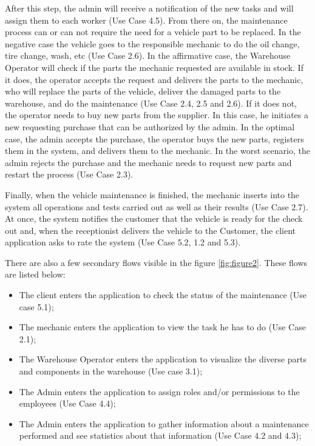 After this step, the admin will receive a notification of the new tasks and will assign them to each worker (Use Case 4.5).
From there on, the maintenance process can or can not require the need for a vehicle part to be replaced. 
In the negative case the vehicle goes to the responsible mechanic to do the oil change, tire change, wash, etc (Use Case 2.6). 
In the affirmative case, the Warehouse Operator will check if the parts the mechanic requested are available in stock. 
If it does, the operator accepts the request and delivers the parts to the mechanic, who will replace the parts of the vehicle, deliver the damaged parts to the warehouse, and do the maintenance (Use Case 2.4, 2.5 and 2.6). 
If it does not, the operator needs to buy new parts from the supplier. 
In this case, he initiates a new requesting purchase that can be authorized by the admin. 
In the optimal case, the admin accepts the purchase, the operator buys the new parts, registers them in the system, and delivers them to the mechanic. 
In the worst scenario, the admin rejects the purchase and the mechanic needs to request new parts and restart the process (Use Case 2.3).    

Finally, when the vehicle maintenance is finished, the mechanic inserts into the system all operations and tests carried out as well as their results (Use Case 2.7). 
At once, the system notifies the customer that the vehicle is ready for the check out and, when the receptionist delivers the vehicle to the Customer, the client application asks to rate the system (Use Case 5.2, 1.2 and 5.3).

There are also a few secondary flows visible in the figure \ref{fig:figure2}. 
These flows are listed below:
\begin{itemize}
  \item The client enters the application to check the status of the maintenance (Use case 5.1);
  \item The mechanic enters the application to view the task he has to do (Use Case 2.1); 
  \item The Warehouse Operator enters the application to visualize the diverse parts and components in the warehouse (Use case 3.1); 
  \item The Admin enters the application to assign roles and/or permissions to the employees (Use Case 4.4); 
  \item The Admin enters the application to gather information about a maintenance performed and see statistics about that information (Use Case 4.2 and 4.3); 
\end{itemize}
 

